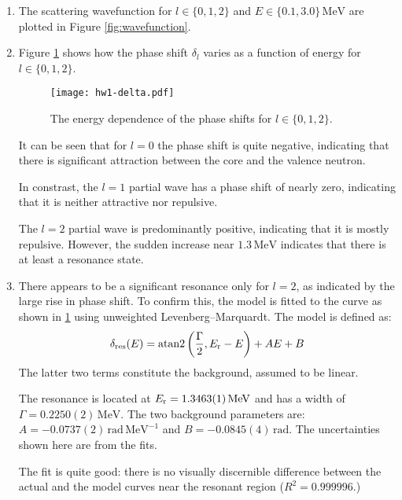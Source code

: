 \documentclass[fleqn, 12pt]{article}
\begin{document}
\begin{enumerate}
\item The scattering wavefunction for $l \in \{0, 1, 2\}$ and
  $E \in \{0.1, 3.0\} \,\mathrm{MeV}$ are plotted in Figure
  \ref{fig:wavefunction}.

\item Figure \ref{fig:phase-shift} shows how the phase shift $\delta_l$ varies
  as a function of energy for $l \in \{0, 1, 2\}$.

  \begin{figure}
    \centering
    \texttt{[image: hw1-delta.pdf]}
    \caption{The energy dependence of the phase shifts for
      $l \in \{0, 1, 2\}$.}
    \label{fig:phase-shift}
  \end{figure}

  It can be seen that for $l = 0$ the phase shift is quite negative,
  indicating that there is significant attraction between the core and the
  valence neutron.

  In constrast, the $l = 1$ partial wave has a phase shift of nearly zero,
  indicating that it is neither attractive nor repulsive.

  The $l = 2$ partial wave is predominantly positive, indicating that it is
  mostly repulsive.  However, the sudden increase near $1.3\,\mathrm{MeV}$
  indicates that there is at least a resonance state.

\item There appears to be a significant resonance only for $l = 2$, as
  indicated by the large rise in phase shift.  To confirm this, the model is
  fitted to the curve as shown in \ref{fig:phase-shift} using unweighted
  Levenberg--Marquardt.  The model is defined as:
  \begin{align*}
    \delta_{\text{res}}(E) =
    \operatorname{atan2}\left(\frac{\Gamma}{2}, E_{\text r} - E\right) +
    A E + B
  \end{align*}
  The latter two terms constitute the background, assumed to be linear.

  The resonance is located at $E_{\text r} = 1.3463(1)\,\mathrm{MeV}$ and has
  a width of $\Gamma = 0.2250(2)\,\mathrm{MeV}$. The two background parameters
  are: $A = -0.0737(2)\,\mathrm{rad}\,\mathrm{MeV}^{-1}$ and
  $B = -0.0845(4)\,\mathrm{rad}$.  The uncertainties shown here are from the
  fits.

  The fit is quite good: there is no visually discernible difference between
  the actual and the model curves near the resonant region ($R^2 = 0.999996$.)

\end{enumerate}
\end{document}
